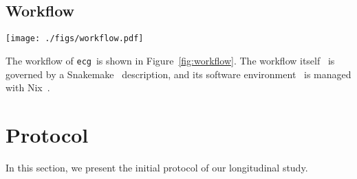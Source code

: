 \documentclass[sigconf,natbib=false]{acmart}
\newcommand{\df}{\texttt{Dockerfile}}
\newcommand{\ecg}{\texttt{ecg}}
\newcommand{\todo}[1]{{\color{red}{TODO: #1}}}
\begin{document}
\subsection{Workflow}\label{sec:workflow}

\begin{figure*}
  \centering
  \texttt{[image: ./figs/workflow.pdf]}
  \caption{
    Workflow of \ecg.
    Each description of an artifact is verified with the Nickel contract and then converted in a JSON representation.
    This JSON representation is then read by \ecg\ to
    download the artifact,
    compute the hash of its content,
    build the container from the \df, and
    extract the software environment information from the built container.
    \ecg\ outputs files containing the information about the artifact and its \df\ .
  }
  \label{fig:workflow}
\end{figure*}

The workflow of \ecg\ is shown in Figure~\ref{fig:workflow}.
The workflow itself~\cite{ecg_workflow} is governed by a Snakemake~\cite{koster2012snakemake} description, and its software environment~\cite{ecg_nix} is managed with Nix~\cite{dolstra_nix_2004}.

% 

\section{Protocol}\label{sec:protocol}

In this section, we present the initial protocol of our longitudinal study.
\end{document}

